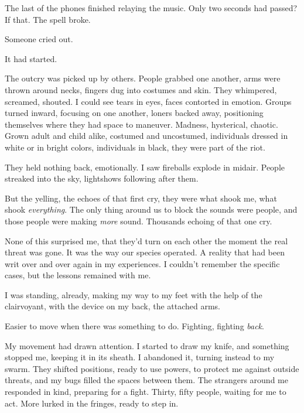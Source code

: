 The last of the phones finished relaying the music.  Only two seconds had passed?  If that.  The spell broke.



Someone cried out.



It had started.



The outcry was picked up by others.  People grabbed one another, arms were thrown around necks, fingers dug into costumes and skin.  They whimpered, screamed, shouted.  I could see tears in eyes, faces contorted in emotion.  Groups turned inward, focusing on one another, loners backed away, positioning themselves where they had space to maneuver.  Madness, hysterical, chaotic.  Grown adult and child alike, costumed and uncostumed, individuals dressed in white or in bright colors, individuals in black, they were part of the riot.



They held nothing back, emotionally.  I saw fireballs explode in midair.  People streaked into the sky, lightshows following after them.



But the yelling, the echoes of that first cry, they were what shook me, what shook \emph{everything}.  The only thing around us to block the sounds were people, and those people were making \emph{more} sound.  Thousands echoing of that one cry.



None of this surprised me, that they'd turn on each other the moment the real threat was gone.  It was the way our species operated.  A reality that had been writ over and over again in my experiences.  I couldn't remember the specific cases, but the lessons remained with me.



I was standing, already, making my way to my feet with the help of the clairvoyant, with the device on my back, the attached arms.



Easier to move when there was something to do.  Fighting, fighting \emph{back}.



My movement had drawn attention.  I started to draw my knife, and something stopped me, keeping it in its sheath.  I abandoned it, turning instead to my swarm.  They shifted positions, ready to use powers, to protect me against outside threats, and my bugs filled the spaces between them.  The strangers around me responded in kind, preparing for a fight.  Thirty, fifty people, waiting for me to act.  More lurked in the fringes, ready to step in.



